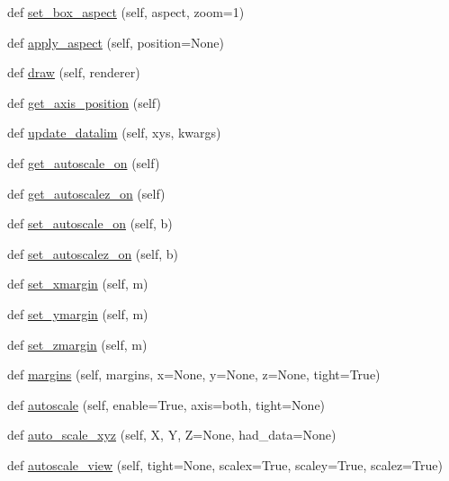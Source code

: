 \begin{DoxyCompactItemize}
def \hyperlink{classmplot3d_1_1axes3d_1_1Axes3D_a96c01ca82c8fe774185cf28aeb0d4eb6}{set\+\_\+box\+\_\+aspect} (self, aspect, zoom=1)
\item 
def \hyperlink{classmplot3d_1_1axes3d_1_1Axes3D_ac34c2dfa65e8719d85cfb7d5c84391fc}{apply\+\_\+aspect} (self, position=None)
\item 
def \hyperlink{classmplot3d_1_1axes3d_1_1Axes3D_a52eb72330acc3e1c0d14e0f3f4919116}{draw} (self, renderer)
\item 
def \hyperlink{classmplot3d_1_1axes3d_1_1Axes3D_a9dc5dda5b3ffce3a1e5fee3e3f92dc11}{get\+\_\+axis\+\_\+position} (self)
\item 
def \hyperlink{classmplot3d_1_1axes3d_1_1Axes3D_af04cc71eabfb0a4a9d18e7dec16e1983}{update\+\_\+datalim} (self, xys, kwargs)
\item 
def \hyperlink{classmplot3d_1_1axes3d_1_1Axes3D_a927b01872fe30d0a1a21412968ee27ff}{get\+\_\+autoscale\+\_\+on} (self)
\item 
def \hyperlink{classmplot3d_1_1axes3d_1_1Axes3D_a9d2207c1791c6b27c4631de27190b2de}{get\+\_\+autoscalez\+\_\+on} (self)
\item 
def \hyperlink{classmplot3d_1_1axes3d_1_1Axes3D_a46c6e1170b4087eaa42fb8d31e07dba0}{set\+\_\+autoscale\+\_\+on} (self, b)
\item 
def \hyperlink{classmplot3d_1_1axes3d_1_1Axes3D_a7e9aa85500363d6b581196c0b720a2d0}{set\+\_\+autoscalez\+\_\+on} (self, b)
\item 
def \hyperlink{classmplot3d_1_1axes3d_1_1Axes3D_a5c254a7402d6f33311e571453487de96}{set\+\_\+xmargin} (self, m)
\item 
def \hyperlink{classmplot3d_1_1axes3d_1_1Axes3D_a104f426764ce775584c4231b8db0dbf8}{set\+\_\+ymargin} (self, m)
\item 
def \hyperlink{classmplot3d_1_1axes3d_1_1Axes3D_a558a2f1d55d04f2c95842b3ed5b4a3f1}{set\+\_\+zmargin} (self, m)
\item 
def \hyperlink{classmplot3d_1_1axes3d_1_1Axes3D_ad84e279cb2e75c08faf5589632b93769}{margins} (self, margins, x=None, y=None, z=None, tight=True)
\item 
def \hyperlink{classmplot3d_1_1axes3d_1_1Axes3D_aa4e3927000687d7225ea7f42b2066032}{autoscale} (self, enable=True, axis=\textquotesingle{}both\textquotesingle{}, tight=None)
\item 
def \hyperlink{classmplot3d_1_1axes3d_1_1Axes3D_a5e155807bc9aa292063f130455b9c69b}{auto\+\_\+scale\+\_\+xyz} (self, X, Y, Z=None, had\+\_\+data=None)
\item 
def \hyperlink{classmplot3d_1_1axes3d_1_1Axes3D_a4acb8c32eb03c5819d3ff1652c48153e}{autoscale\+\_\+view} (self, tight=None, scalex=True, scaley=True, scalez=True)

\end{DoxyCompactItemize}
